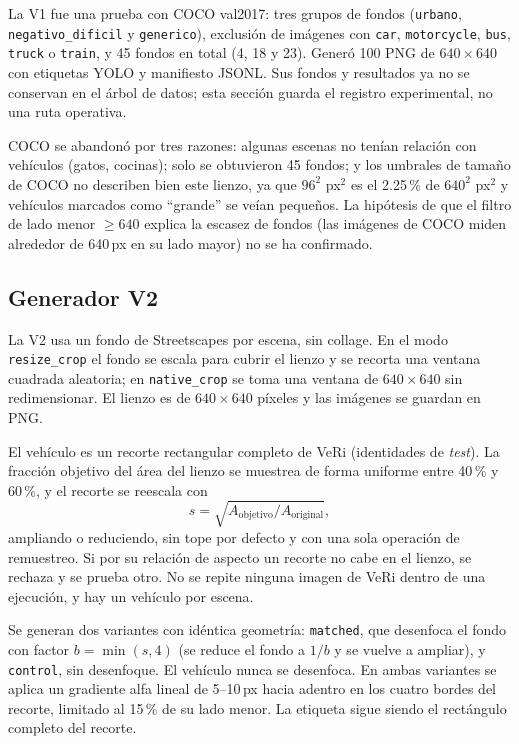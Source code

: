 \documentclass[11pt,a4paper]{article}
\begin{document}
La V1 fue una prueba con COCO val2017: tres grupos de fondos (\texttt{urbano},
\texttt{negativo\_dificil} y \texttt{generico}), exclusi\'on de im\'agenes con \texttt{car},
\texttt{motorcycle}, \texttt{bus}, \texttt{truck} o \texttt{train}, y 45 fondos en total
(4, 18 y 23). Gener\'o 100 PNG de $640\times640$ con etiquetas YOLO y manifiesto JSONL.
Sus fondos y resultados ya no se conservan en el \'arbol de datos; esta secci\'on guarda el
registro experimental, no una ruta operativa.

COCO se abandon\'o por tres razones: algunas escenas no ten\'ian relaci\'on con veh\'iculos
(gatos, cocinas); solo se obtuvieron 45 fondos; y los umbrales de tama\~no de COCO no
describen bien este lienzo, ya que $96^2$ px$^2$ es el 2.25\,\% de $640^2$ px$^2$ y
veh\'iculos marcados como ``grande'' se ve\'ian peque\~nos. La hip\'otesis de que el filtro de
lado menor $\geq 640$ explica la escasez de fondos (las im\'agenes de COCO miden
alrededor de 640\,px en su lado mayor) no se ha confirmado.

\subsection{Generador V2}

La V2 usa un fondo de Streetscapes por escena, sin collage. En el modo
\texttt{resize\_crop} el fondo se escala para cubrir el lienzo y se recorta una ventana
cuadrada aleatoria; en \texttt{native\_crop} se toma una ventana de $640\times640$ sin
redimensionar. El lienzo es de $640\times640$ p\'ixeles y las im\'agenes se guardan en PNG.

El veh\'iculo es un recorte rectangular completo de VeRi (identidades de \emph{test}). La
fracci\'on objetivo del \'area del lienzo se muestrea de forma uniforme entre 40\,\% y
60\,\%, y el recorte se reescala con
\[
  s=\sqrt{A_{\text{objetivo}}/A_{\text{original}}},
\]
ampliando o reduciendo, sin tope por defecto y con una sola operaci\'on de remuestreo. Si
por su relaci\'on de aspecto un recorte no cabe en el lienzo, se rechaza y se prueba otro. No
se repite ninguna imagen de VeRi dentro de una ejecuci\'on, y hay un veh\'iculo por escena.

Se generan dos variantes con id\'entica geometr\'ia: \texttt{matched}, que desenfoca el
fondo con factor $b=\min(s,4)$ (se reduce el fondo a $1/b$ y se vuelve a ampliar), y
\texttt{control}, sin desenfoque. El veh\'iculo nunca se desenfoca. En ambas variantes se
aplica un gradiente alfa lineal de 5--10\,px hacia adentro en los cuatro bordes del
recorte, limitado al 15\,\% de su lado menor. La etiqueta sigue siendo el rect\'angulo
completo del recorte.
\end{document}
